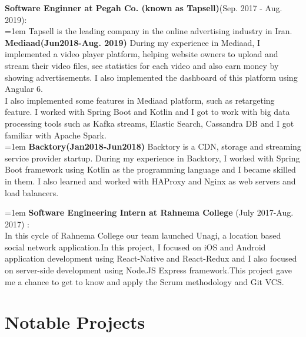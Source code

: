 \documentclass[line, mm]{sampleCV}
\begin{document}
\begin{resume}
\textbf{Software Enginner at Pegah Co. (known as Tapsell)}(Sep. 2017 - Aug. 2019): \\
\hangindent=1em
Tapsell is the leading company in the online advertising industry in Iran. \\
\textbf{Mediaad(Jun2018-Aug. 2019)}
During my experience in Mediaad, I implemented a video player platform, helping website owners to upload and stream their video files, see statistics for each video and also earn money by showing advertisements. I also implemented the dashboard of this platform using Angular 6.\\
I also implemented some features in Mediaad platform, such as retargeting feature. 
I worked with Spring Boot and Kotlin and I got to work with big data processing tools such as Kafka streams, Elastic Search, Cassandra DB and I got familiar with Apache Spark.\\
\hangindent=1em
\textbf{Backtory(Jan2018-Jun2018)}
Backtory is a CDN, storage and streaming service provider startup. 
During my experience in Backtory, I worked with Spring Boot framework using Kotlin as the programming language and I became skilled in them. 
I also learned and worked with HAProxy and Nginx as web servers and load balancers.

\hangindent=1em
\textbf{Software Engineering Intern at Rahnema College} (July 2017-Aug. 2017) : \\
 In this cycle of Rahnema College our team launched Unagi, a location based social network application.In this project, I focused on iOS and Android application development using React-Native and React-Redux	 and I also focused on server-side development using Node.JS Express framework.This project gave me a chance to get to know and apply the Scrum methodology and Git VCS.

\section{\mysidestyle Notable Projects}
\begin{list2}


\end{list2}
\end{resume}
\end{document}
